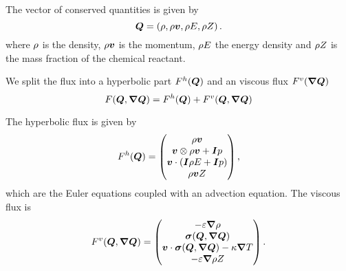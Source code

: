 The vector of conserved quantities is given by
\begin{equation}
  \label{eq:conserved-variables}
 \bm{Q} = \left( \rho, \rho \bm{v}, \rho E, \rho Z \right).
\end{equation}
where $\rho$ is the density, $\rho \bm{v}$ is the momentum, $\rho E$ the energy density and $\rho Z$ is the mass fraction of the chemical reactant.

We split the flux into a hyperbolic part $F^{h}(\bm{Q})$ and an viscous flux $\viscFlux(\gradQ)$
\begin{equation}
  \label{eq:flux}
  \flux(\Q, \gradQ) = \hyperFlux(\Q) + \viscFlux(\Q, \gradQ)
\end{equation}

\newcommand{\diffCoeff}{\varepsilon}
\newcommand{\hyperFluxDef}{
  \begin{pmatrix}
    \Qj \\
    \Qv  \otimes \Qj + \bm{I} \pressure  \\
    \Qv \cdot (\bm{I} \QE + \bm{I} \pressure) \\
    \Qj \QZZ
  \end{pmatrix}
}

\newcommand{\viscFluxDef}{
  \begin{pmatrix}
     -\diffCoeff \gradient{\Qrho}\\
     \stressT (\Q, \gradQ)  \\
     \Qv \cdot \stressT (\Q, \gradQ) - \kappa \gradient{T}\\
     -\diffCoeff \gradient{\QZ}
   \end{pmatrix}
}


The hyperbolic flux is given by
\begin{equation}
  \label{eq:hyper-flux}
  \hyperFlux(\Q) = \hyperFluxDef,
\end{equation}
which are the Euler equations coupled with an advection equation.
The viscous flux is
\begin{equation}
  \label{eq:visc-flux}
  \viscFlux(\Q, \gradQ) = \viscFluxDef.
\end{equation}


